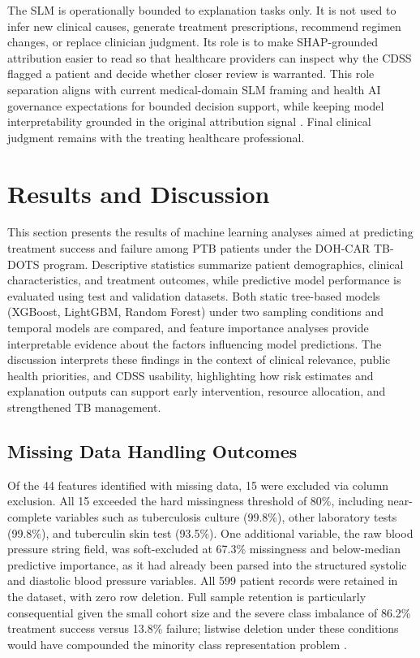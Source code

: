 \documentclass[12pt]{article}
\begin{document}
The SLM is operationally bounded to explanation tasks only. It is not used to infer new clinical causes, generate treatment prescriptions, recommend regimen changes, or replace clinician judgment. Its role is to make SHAP-grounded attribution easier to read so that healthcare providers can inspect why the CDSS flagged a patient and decide whether closer review is warranted. This role separation aligns with current medical-domain SLM framing and health AI governance expectations for bounded decision support, while keeping model interpretability grounded in the original attribution signal \citep{ref40, ref42, ref44}. Final clinical judgment remains with the treating healthcare professional.


\section{Results and Discussion}

This section presents the results of machine learning analyses aimed at predicting treatment success and failure among PTB patients under the DOH-CAR TB-DOTS program. Descriptive statistics summarize patient demographics, clinical characteristics, and treatment outcomes, while predictive model performance is evaluated using test and validation datasets. Both static tree-based models (XGBoost, LightGBM, Random Forest) under two sampling conditions and temporal models are compared, and feature importance analyses provide interpretable evidence about the factors influencing model predictions. The discussion interprets these findings in the context of clinical relevance, public health priorities, and CDSS usability, highlighting how risk estimates and explanation outputs can support early intervention, resource allocation, and strengthened TB management.


\subsection{Missing Data Handling Outcomes}

Of the 44 features identified with missing data, 15 were excluded via column exclusion. All 15 exceeded the hard missingness threshold of 80\%, including near-complete variables such as tuberculosis culture (99.8\%), other laboratory tests (99.8\%), and tuberculin skin test (93.5\%). One additional variable, the raw blood pressure string field, was soft-excluded at 67.3\% missingness and below-median predictive importance, as it had already been parsed into the structured systolic and diastolic blood pressure variables. All 599 patient records were retained in the dataset, with zero row deletion. Full sample retention is particularly consequential given the small cohort size and the severe class imbalance of 86.2\% treatment success versus 13.8\% failure; listwise deletion under these conditions would have compounded the minority class representation problem \citep{ref32}.
\end{document}
